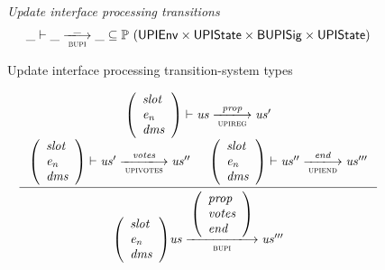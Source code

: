 \documentclass[11pt,a4paper]{article}
\newcommand{\powerset}[1]{\mathbb{P}~#1}
\newcommand{\var}[1]{\mathit{#1}}
\newcommand{\trans}[2]{\xlongrightarrow[\textsc{#1}]{#2}}
\begin{document}
\begin{figure}[ht]
  \emph{Update interface processing transitions}
  \begin{equation*}
    \_ \vdash \var{\_} \trans{bupi}{\_} \var{\_} \subseteq
    \powerset (\UPIEnv \times \UPIState \times \Bupisig \times \UPIState)
  \end{equation*}
  \caption{Update interface processing transition-system types}
  \label{fig:ts-types:bupi}
\end{figure}

\begin{figure}[ht]
  \begin{equation*}
    \inference
    { {\left(
          \begin{array}{l}
            \var{slot} \\
            \var{e_n} \\
            \var{dms}
          \end{array}
        \right)
      }
      \vdash \var{us} \trans{upireg}{\var{prop}} \var{us'}
      \\
      {\left(
          \begin{array}{l}
            \var{slot} \\
            \var{e_n} \\
            \var{dms}
          \end{array}
        \right)}
      \vdash \var{us'} \trans{upivotes}{\var{votes}} \var{us''}
      &
      {\left(
          \begin{array}{l}
            \var{slot} \\
            \var{e_n} \\
            \var{dms}
          \end{array}
        \right)}
      \vdash \var{us''} \trans{upiend}{\var{end}} \var{us'''}
    }
    {
      {\left(
          \begin{array}{l}
            \var{slot} \\
            \var{e_n} \\
            \var{dms}
          \end{array}
        \right)}
      {\var{us}}
      \trans{bupi}
      {
        \left(
          \begin{array}{l}
            \var{prop} \\
            \var{votes} \\
            \var{end}
          \end{array}
        \right)
      }
      {\var{us'''}}
    }
  \end{equation*}

\end{figure}
\end{document}

